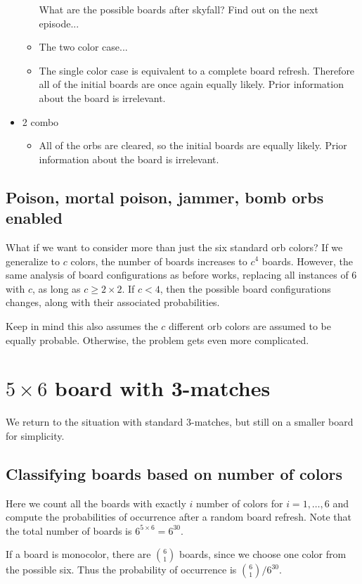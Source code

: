 \documentclass[12pt]{article}
\begin{document}
\begin{itemize}
\begin{itemize}
        What are the possible boards after skyfall? Find out on the next episode...
        \item 
        The two color case...
        \item The single color case is equivalent to a complete board refresh. Therefore all of the initial boards are once again equally likely. Prior information about the board is irrelevant.
    \end{itemize}
    \item 2 combo
    \begin{itemize}
        \item All of the orbs are cleared, so the initial boards are equally likely. Prior information about the board is irrelevant.
    \end{itemize}
\end{itemize}
\subsection{Poison, mortal poison, jammer, bomb orbs enabled}
What if we want to consider more than just the six standard orb colors? If we generalize to $c$ colors, the number of boards increases to $c^4$ boards. However, the same analysis of board configurations as before works, replacing all instances of 6 with $c$, as long as $c\geq 2\times 2$. If $c<4$, then the possible board configurations changes, along with their associated probabilities.

Keep in mind this also assumes the $c$ different orb colors are assumed to be equally probable. Otherwise, the problem gets even more complicated.


\section{$5\times 6$ board with 3-matches}
We return to the situation with standard 3-matches, but still on a smaller board for simplicity.

\subsection{Classifying boards based on number of colors}

Here we count all the boards with exactly $i$ number of colors for $i=1,\dots,6$ and compute the probabilities of occurrence after a random board refresh. Note that the total number of boards is $6^{5\times 6}=6^{30}$.

If a board is monocolor, there are $\binom{6}{1}$ boards, since we choose one color from the possible six. Thus the probability of occurrence is $\binom{6}{1}/6^{30}$.
\end{document}

